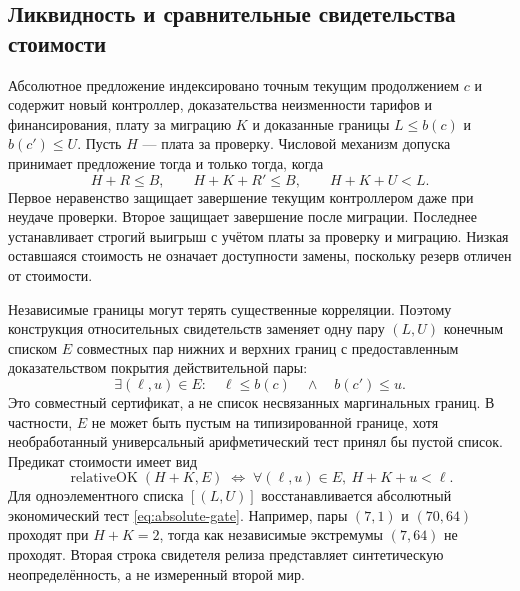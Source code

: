 \documentclass[10pt,a4paper]{article}
\begin{document}
\subsection{Ликвидность и сравнительные свидетельства стоимости}
Абсолютное предложение индексировано точным текущим продолжением $c$ и содержит новый контроллер, доказательства неизменности тарифов и финансирования, плату за миграцию $K$ и доказанные границы $L\le b(c)$ и $b(c')\le U$. Пусть $H$ --- плата за проверку. Числовой механизм допуска принимает предложение тогда и только тогда, когда
\begin{equation}\label{eq:absolute-gate}
 H+R\le B,\qquad H+K+R'\le B,\qquad H+K+U<L.
\end{equation}
Первое неравенство защищает завершение текущим контроллером даже при неудаче проверки. Второе защищает завершение после миграции. Последнее устанавливает строгий выигрыш с учётом платы за проверку и миграцию. Низкая оставшаяся стоимость не означает доступности замены, поскольку резерв отличен от стоимости.

Независимые границы могут терять существенные корреляции. Поэтому конструкция относительных свидетельств заменяет одну пару $(L,U)$ конечным списком $E$ совместных пар нижних и верхних границ с предоставленным доказательством покрытия действительной пары:
\begin{equation}\label{eq:actual-coverage}
 \exists (\ell,u)\in E:\quad \ell\le b(c)\quad\land\quad b(c')\le u.
\end{equation}
Это совместный сертификат, а не список несвязанных маргинальных границ. В частности, $E$ не может быть пустым на типизированной границе, хотя необработанный универсальный арифметический тест принял бы пустой список. Предикат стоимости имеет вид
\begin{equation}\label{eq:relative-gate}
 \operatorname{relativeOK}(H+K,E)\;\Longleftrightarrow\;
 \forall(\ell,u)\in E,\ H+K+u<\ell.
\end{equation}
Для одноэлементного списка $[(L,U)]$ восстанавливается абсолютный экономический тест \eqref{eq:absolute-gate}. Например, пары $(7,1)$ и $(70,64)$ проходят при $H+K=2$, тогда как независимые экстремумы $(7,64)$ не проходят. Вторая строка свидетеля релиза представляет синтетическую неопределённость, а не измеренный второй мир.
\end{document}
